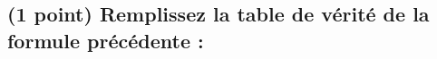 \documentclass[11pt,a4paper]{article}
\begin{document}
\begin{table}[!ht]
  \centering
  \begin{minipage}{0.50\textwidth}
    \centering

\subsection{(1 point) Remplissez la table de vérité de la formule précédente : }




\end{minipage}
\end{table}
\end{document}
